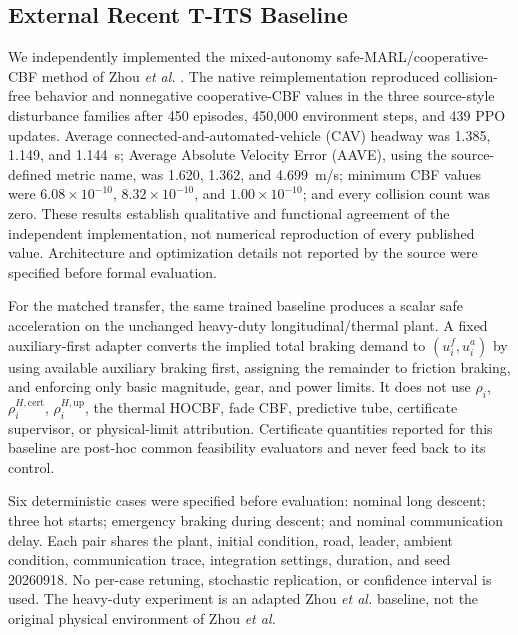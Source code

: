 \subsection{External Recent T-ITS Baseline}
We independently implemented the mixed-autonomy safe-MARL/cooperative-CBF method of Zhou \emph{et al.} \cite{zhou2026cooperative}. The native reimplementation reproduced collision-free behavior and nonnegative cooperative-CBF values in the three source-style disturbance families after 450 episodes, 450,000 environment steps, and 439 PPO updates. Average connected-and-automated-vehicle (CAV) headway was 1.385, 1.149, and 1.144~s; Average Absolute Velocity Error (AAVE), using the source-defined metric name, was 1.620, 1.362, and 4.699~m/s; minimum CBF values were $6.08\times10^{-10}$, $8.32\times10^{-10}$, and $1.00\times10^{-10}$; and every collision count was zero. These results establish qualitative and functional agreement of the independent implementation, not numerical reproduction of every published value. Architecture and optimization details not reported by the source were specified before formal evaluation.

For the matched transfer, the same trained baseline produces a scalar safe acceleration on the unchanged heavy-duty longitudinal/thermal plant. A fixed auxiliary-first adapter converts the implied total braking demand to $(u_i^f,u_i^a)$ by using available auxiliary braking first, assigning the remainder to friction braking, and enforcing only basic magnitude, gear, and power limits. It does not use $\rho_i$, $\rho_i^{H,\mathrm{cert}}$, $\rho_i^{H,\mathrm{up}}$, the thermal HOCBF, fade CBF, predictive tube, certificate supervisor, or physical-limit attribution. Certificate quantities reported for this baseline are post-hoc common feasibility evaluators and never feed back to its control.

Six deterministic cases were specified before evaluation: nominal long descent; three hot starts; emergency braking during descent; and nominal communication delay. Each pair shares the plant, initial condition, road, leader, ambient condition, communication trace, integration settings, duration, and seed 20260918. No per-case retuning, stochastic replication, or confidence interval is used. The heavy-duty experiment is an adapted Zhou \emph{et al.} baseline, not the original physical environment of Zhou \emph{et al.}

